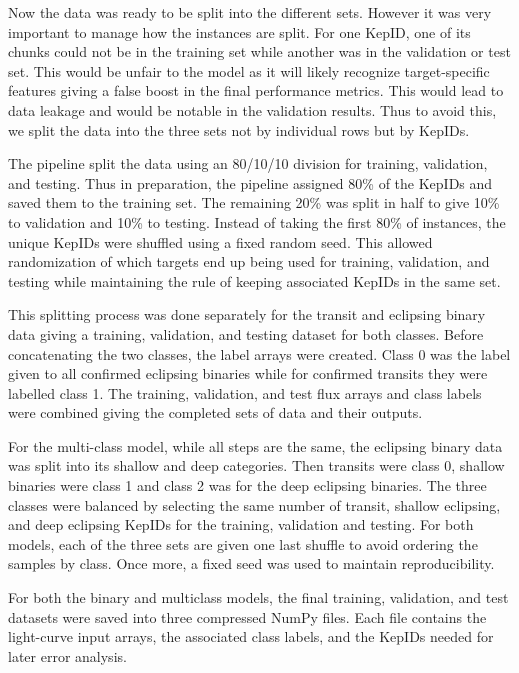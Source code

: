 Now the data was ready to be split into the different sets. However it was very important to manage how the instances are split. For one KepID, one of its chunks could not be in the training set while another was in the validation or test set. This would be unfair to the model as it will likely recognize target-specific features giving a false boost in the final performance metrics. This would lead to data leakage and would be notable in the validation results. Thus to avoid this, we split the data into the three sets not by individual rows but by KepIDs.

The pipeline split the data using an 80/10/10 division for training, validation, and testing. Thus in preparation, the pipeline assigned 80\% of the KepIDs and saved them to the training set. The remaining 20\% was split in half to give 10\% to validation and 10\% to testing. Instead of taking the first 80\% of instances, the unique KepIDs were shuffled using a fixed random seed. This allowed randomization of which targets end up being used for training, validation, and testing while maintaining the rule of keeping associated KepIDs in the same set. 

This splitting process was done separately for the transit and eclipsing binary data giving a training, validation, and testing dataset for both classes. Before concatenating the two classes, the label arrays were created. Class 0 was the label given to all confirmed eclipsing binaries while for confirmed transits they were labelled class 1. The training, validation, and test flux arrays and class labels were combined giving the completed sets of data and their outputs. 

For the multi-class model, while all steps are the same, the eclipsing binary data was split into its shallow and deep categories. Then transits were class 0, shallow binaries were class 1 and class 2 was for the deep eclipsing binaries. The three classes were balanced by selecting the same number of transit, shallow eclipsing, and deep eclipsing KepIDs for the training, validation and testing. For both models, each of the three sets are given one last shuffle to avoid ordering the samples by class. Once more, a fixed seed was used to maintain reproducibility.  

For both the binary and multiclass models, the final training, validation, and test datasets were saved into three compressed NumPy files. Each file contains the light-curve input arrays, the associated class labels, and the KepIDs needed for later error analysis. 

